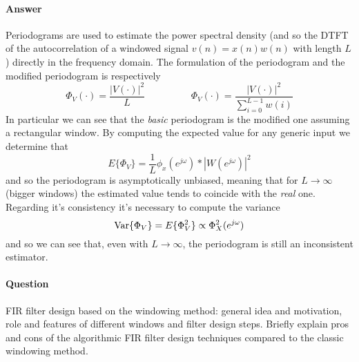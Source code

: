 	\paragraph{Answer} Periodograms are used to estimate the power spectral density (and so the DTFT of the autocorrelation of a windowed signal $v(n) = x(n)w(n)$ with length $L$) directly in the frequency domain. The formulation of the periodogram and the modified periodogram is respectively
	\[ \Phi_V(\cdot) = \frac{|V(\cdot)|^2}{ L } \hspace{2cm} \Phi_V(\cdot) = \frac{|V(\cdot)|^2}{\sum_{i=0}^{L-1} w(i)} \]
	In particular we can see that the \textit{basic} periodogram is the modified one assuming a rectangular window. By computing the expected value for any generic input we determine that
	\[ E\{\Phi_V\} = \frac 1 L \phi_x(e^{j\omega}) * |W(e^{j\omega})|^2 \]
	and so the periodogram is asymptotically unbiased, meaning that for $L\rightarrow \infty$ (bigger windows) the estimated value tends to coincide with the \textit{real} one. Regarding it's consistency it's necessary to compute the variance
	\[ \textrm{Var}\{\Phi_V\} = E\{ \Phi_V^2 \} \propto \Phi_X^2(e^{j\omega}) \]
	and so we can see that, even with $L\rightarrow \infty$, the periodogram is still an inconsistent estimator.
	
\newquestion
	\paragraph{Question} FIR filter design based on the windowing method: general idea and motivation, role and features of different windows and filter design steps. Briefly explain pros and cons of the algorithmic FIR filter design techniques compared to the classic windowing method.
	
